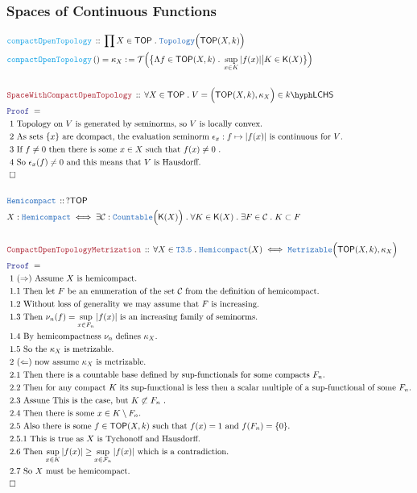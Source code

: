 \documentclass[12pt]{scrartcl}
\newcommand{\TYPE}[1]{\textcolor{NavyBlue}{\mathtt{#1}}}
\newcommand{\FUNC}[1]{\textcolor{Cerulean}{\mathtt{#1}}}
\newcommand{\LOGIC}[1]{\textcolor{Blue}{\mathtt{#1}}}
\newcommand{\THM}[1]{\textcolor{Maroon}{\mathtt{#1}}}
\renewcommand{\.}{\; . \;}
\newcommand{\de}{: \kern 0.1pc =}
\newcommand{\Act}[1]{\left( #1 \right)}
\newcommand{\Theorem}[2]{& \THM{#1} \, :: \, #2 \\ & \Proof = \\ }
\newcommand{\DeclareType}[2]{& \TYPE{#1} \, :: \, #2 \\}
\newcommand{\DefineType}[3]{& #1 : \TYPE{#2} \iff #3 \\}
\newcommand{\DeclareFunc}[2]{& \FUNC{#1} \, :: \, #2 \\}
\newcommand{\DefineNamedFunc}[4]{&  \FUNC{#1}\Act{#2} = #3 \de #4 \\}
\newcommand{\Page}[1]{ \begin{align*} #1 \end{align*}   }
\newcommand{\Explain}[1]{& \text{#1.} \\}
\newcommand{\QED}{\; \square}
\newcommand{\EndProof}{& \QED \\}
\newcommand{\Proof}{\LOGIC{Proof} \; }
\renewcommand{\C}{\mathcal{C}}
\newcommand{\Top}{\TYPE{Topology}}
\newcommand{\TOP}{\mathsf{TOP}}
\newcommand{\T}{\mathcal{T}}
\newcommand{\F}{\mathcal{F}}
\newcommand{\K}{\mathsf{K}}
\newcommand{\LCHS}[1]{{#1}\hyph\mathsf{LCHS}}
\begin{document}
\subsubsection{Spaces of Continuous Functions}
\Page{
	\DeclareFunc{compactOpenTopology}
	{
		\prod X \in \TOP \. \Top\Big(\TOP(X,k)\Big)
	}
	\DefineNamedFunc{compactOpenTopology}{}{\kappa_X}
	{
		\T \Big( 
			\big\{ \Lambda f \in \TOP(X,k) \.  \sup_{x \in K} |f(x)| \big| K \in \K(X) \big\} \Big)		
	}
	\\
	\Theorem{SpaceWithCompactOpenTopology}
	{
		\forall X \in \TOP \. V = \Big( \TOP(X,k), \kappa_X \Big) \in \LCHS{k}
	}
	\Explain{ 1 Topology on $V$ is generated by seminorms, so $V$ is locally convex}
	\Explain{ 2 As sets $\{x\}$ are dcompact, 
		the evaluation seminorm $\epsilon_x : f \mapsto |f(x)|$ is continuous for $V$}
	\Explain{
		3 If $f \neq 0$ then there is some $x \in X$ such that $f(x) \neq 0$ 
	}
	\Explain{ 4 So $\epsilon_x(f) \neq 0$  and this means that $V$ is Hausdorff}
	\EndProof	
	\\
	\DeclareType{Hemicompact}{?\TOP}
	\DefineType{X}{Hemicompact}{
		\exists \C : \TYPE{Countable}\Big( \K(X) \Big) \. \forall K \in \K(X) \. \exists F \in \C \. K \subset F 
	}
	\\
	\Theorem{CompactOpenTopologyMetrization}
	{
		\forall X \in \TYPE{T3.5} \.
		\TYPE{Hemicompact}(X)
		\iff
		\TYPE{Metrizable}\Big( \TOP(X,k), \kappa_X \Big)
	}
	\Explain{ 1 $(\Rightarrow)$ Assume $X$ is hemicompact}
	\Explain{ 1.1 Then let $F$ be an enumeration of the set $\C$ from the definition of hemicompact}
	\Explain{ 1.2 Without loss of generality we may assume that $F$ is increasing}
	\Explain{ 1.3 Then $\nu_n(f) = \sup_{x \in F_n} |f(x)|$ is an increasing family of seminorms}
	\Explain{ 1.4 By hemicompactness $\nu_n$ defines $\kappa_X$}
	\Explain{ 1.5 So the $\kappa_X$ is metrizable}
	\Explain{ 2 $(\Leftarrow)$ now assume $\kappa_X$ is metrizable}
	\Explain{ 2.1 Then there is a countable base defined by sup-functionals for some compacts $F_n$}
	\Explain{ 2.2 Then for any compact $K$ its sup-functional is less then a scalar multiple of
		a sup-functional of some $F_n$}
	\Explain{ 2.3 Assune This is the case, but $K \not \subset F_n$ }
	\Explain{ 2.4 Then there is some $x \in K \setminus F_n$}
	\Explain{ 2.5 Also there is some $f \in \TOP(X,k)$ such that $f(x) = 1$ and $f(F_n)=\{0\}$}
	\Explain{ 2.5.1 This is true as $X$ is Tychonoff and Hausdorff}
	\Explain{ 2.6 Then $\sup_{x \in K} |f(x)| \ge \sup_{x \in \F_n} |f(x)|$ which is a contradiction}
	\Explain{ 2.7 So $X$ must be hemicompact}
	\EndProof 
}
\end{document}
